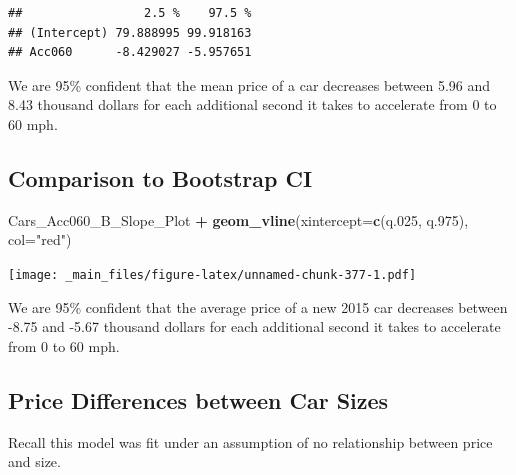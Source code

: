 \documentclass[]{book}
\newenvironment{Shaded}{\begin{snugshade}}{\end{snugshade}}
\newcommand{\KeywordTok}[1]{\textcolor[rgb]{0.13,0.29,0.53}{\textbf{#1}}}
\newcommand{\DataTypeTok}[1]{\textcolor[rgb]{0.13,0.29,0.53}{#1}}
\newcommand{\DecValTok}[1]{\textcolor[rgb]{0.00,0.00,0.81}{#1}}
\newcommand{\StringTok}[1]{\textcolor[rgb]{0.31,0.60,0.02}{#1}}
\newcommand{\OperatorTok}[1]{\textcolor[rgb]{0.81,0.36,0.00}{\textbf{#1}}}
\newcommand{\NormalTok}[1]{#1}
\begin{document}
\begin{verbatim}
##                 2.5 %    97.5 %
## (Intercept) 79.888995 99.918163
## Acc060      -8.429027 -5.957651
\end{verbatim}

We are 95\% confident that the mean price of a car decreases between
5.96 and 8.43 thousand dollars for each additional second it takes to
accelerate from 0 to 60 mph.

\subsection{Comparison to Bootstrap
CI}\label{comparison-to-bootstrap-ci}

\begin{Shaded}
\end{Shaded}

\begin{Shaded}
\begin{Highlighting}[]
\NormalTok{Cars_Acc060_B_Slope_Plot }\OperatorTok{+}\StringTok{ }\KeywordTok{geom_vline}\NormalTok{(}\DataTypeTok{xintercept=}\KeywordTok{c}\NormalTok{(q.}\DecValTok{025}\NormalTok{, q.}\DecValTok{975}\NormalTok{), }\DataTypeTok{col=}\StringTok{"red"}\NormalTok{)}
\end{Highlighting}
\end{Shaded}

\texttt{[image: \_main\_files/figure-latex/unnamed-chunk-377-1.pdf]}

We are 95\% confident that the average price of a new 2015 car decreases
between -8.75 and -5.67 thousand dollars for each additional second it
takes to accelerate from 0 to 60 mph.

\subsection{Price Differences between Car
Sizes}\label{price-differences-between-car-sizes}

Recall this model was fit under an assumption of no relationship between
price and size.
\end{document}
